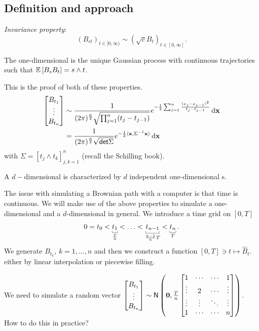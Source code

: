 \documentclass[12pt]{report}
\begin{document}
\subsection{Definition and approach}
\begin{definition}
	\emph{Invariance property}:
	\begin{equation*}
		{(B_{ct})}_{t\in[0,\infty)}\sim{(\sqrt{c}B_{t})}_{t\in[0,\infty]}.
	\end{equation*}
\end{definition}
The one-dimensional \bwm{} is the unique Gaussian process with continuous trajectories such that $\mathbb{E}\left[B_{s}B_{t}\right]=s\wedge t$.
\begin{fancyproof}
	This is the proof of both of these properties.
	\begin{align*}
		\begin{bmatrix}
			B_{t_{1}}\\
			\vdots\\
			B_{t_{n}}
		\end{bmatrix}&\sim\frac{1}{(2\pi)^{\frac{n}{2}}\sqrt{\prod_{j=1}^{n}(t_{j}-t_{j-1})}}e^{-\frac{1}{2}\sum_{j=1}^{n}\frac{(x_{j}-x_{j-1})^{2}}{t_{j}-t_{j-1}}}\mathop{}\!\mathrm{d}\mathbf{x}\\
		&=\frac{1}{(2\pi)^{\frac{n}{2}}\sqrt{\mathsf{det}\Sigma}}e^{-\frac{1}{2}\langle\mathbf{x},\Sigma^{-1}\mathbf{x}\rangle}\mathop{}\!\mathrm{d}\mathbf{x}
	\end{align*}
	with $\Sigma=[t_{j}\wedge t_{k}]^{n}_{j,k=1}$ (recall the Schilling book).
\end{fancyproof}
A $d-$dimensional \bwm{} is characterized by $d$ independent one-dimensional \bwm s.\par
The issue with simulating a Brownian path with a computer is that time is continuous. We will make use of the above properties to simulate a one-dimensional \bwm{} and a $d$-dimensional in general. We introduce a time grid on $[0,T]$
\begin{equation*}
	0=t_{0}<\ubracketthin{t_{1}}_{\frac{T}{n}}<\ldots<\ubracketthin{t_{n-1}}_{\frac{n-1}{n}T}<\ubracketthin{t_{n}}_{T}.
\end{equation*}
We generate $B_{t_{k}}$, $k=1,\ldots,n$ and then we construct a function $[0,T]\ni t\mapsto\hat{B}_{t}$. either by linear interpolation or piecewise filling.\par
We need to simulate a random vector $\begin{bmatrix}
	B_{t_{1}}\\
	\vdots\\
	B_{t_{n}}
\end{bmatrix}\sim\mathsf{N}\left(\mathbf{0},\frac{T}{n}\begin{bmatrix}
	1&\cdots&\cdots&1\\
	\vdots&2&\cdots&\vdots\\
	\vdots&\vdots&\ddots&\vdots\\
	1&\cdots&\cdots&n
	\end{bmatrix}\right)$. How to do this in practice?
\end{document}
